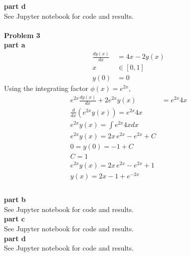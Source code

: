 \documentclass{article} %
\begin{document}
\textbf{part d} \\
See Jupyter notebook for code and results. \\
\\


\textbf{Problem 3} \\

\textbf{part a} \\
\begin{align*}
\frac{dy(x)}{dx} &= 4x - 2y(x) \\
x &\in [0,1] \\
y(0) &= 0
\end{align*}
Using the integrating factor $\phi(x) = e^{2x}$,
\begin{align*}
e^{2x}\frac{dy(x)}{dx} + 2e^{2x}y(x) &= e^{2x}4x \\
\frac{d}{dx}(e^{2x} y(x)) = e^{2x}4x \\
e^{2x} y(x) = \int e^{2x}4x dx \\
e^{2x} y(x) = 2x\,e^{2x} -e^{2x} + C\\
0 = y(0) = -1 + C \\
C = 1 \\
e^{2x} y(x) = 2x\,e^{2x} -e^{2x} + 1\\
y(x) = 2x - 1 + e^{-2x} \\
\end{align*}
\\

\textbf{part b} \\
See Jupyter notebook for code and results.  
\\

\textbf{part c} \\
See Jupyter notebook for code and results.  
\\

\textbf{part d} \\
See Jupyter notebook for code and results.  
\\
\end{document}
